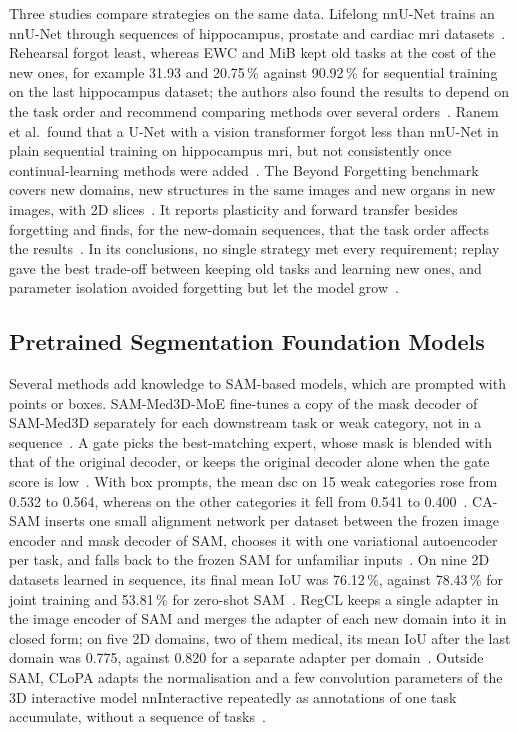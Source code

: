 Three studies compare strategies on the same data.
Lifelong nnU-Net trains an nnU-Net through sequences of hippocampus, prostate and cardiac \gls{mri} datasets~\cite{gonzalez2023lifelong}.
Rehearsal forgot least, whereas EWC and MiB kept old tasks at the cost of the new ones, for example 31.93 and 20.75\,\% against 90.92\,\% for sequential training on the last hippocampus dataset; the authors also found the results to depend on the task order and recommend comparing methods over several orders~\cite{gonzalez2023lifelong}.
Ranem et al.\ found that a U-Net with a vision transformer forgot less than nnU-Net in plain sequential training on hippocampus \gls{mri}, but not consistently once continual-learning methods were added~\cite{ranem2022continualhippocampussegmentationtransformers}.
The Beyond Forgetting benchmark covers new domains, new structures in the same images and new organs in new images, with 2D slices~\cite{wang2026beyondforgetting}.
It reports plasticity and forward transfer besides forgetting and finds, for the new-domain sequences, that the task order affects the results~\cite{wang2026beyondforgetting}.
In its conclusions, no single strategy met every requirement; replay gave the best trade-off between keeping old tasks and learning new ones, and parameter isolation avoided forgetting but let the model grow~\cite{wang2026beyondforgetting}.

\subsection{Pretrained Segmentation Foundation Models}
\label{subsec:cl-medseg-fm}

Several methods add knowledge to SAM-based models, which are prompted with points or boxes.
SAM-Med3D-MoE fine-tunes a copy of the mask decoder of SAM-Med3D separately for each downstream task or weak category, not in a sequence~\cite{wang2024sammed3dmoe}.
A gate picks the best-matching expert, whose mask is blended with that of the original decoder, or keeps the original decoder alone when the gate score is low~\cite{wang2024sammed3dmoe}.
With box prompts, the mean \gls{dsc} on 15 weak categories rose from 0.532 to 0.564, whereas on the other categories it fell from 0.541 to 0.400~\cite{wang2024sammed3dmoe}.
CA-SAM inserts one small alignment network per dataset between the frozen image encoder and mask decoder of SAM, chooses it with one variational autoencoder per task, and falls back to the frozen SAM for unfamiliar inputs~\cite{wang2025casam}.
On nine 2D datasets learned in sequence, its final mean IoU was 76.12\,\%, against 78.43\,\% for joint training and 53.81\,\% for zero-shot SAM~\cite{wang2025casam}.
RegCL keeps a single adapter in the image encoder of SAM and merges the adapter of each new domain into it in closed form; on five 2D domains, two of them medical, its mean IoU after the last domain was 0.775, against 0.820 for a separate adapter per domain~\cite{shu2025regcl}.
Outside SAM, CLoPA adapts the normalisation and a few convolution parameters of the 3D interactive model nnInteractive repeatedly as annotations of one task accumulate, without a sequence of tasks~\cite{esmaeili2026clopa}.

